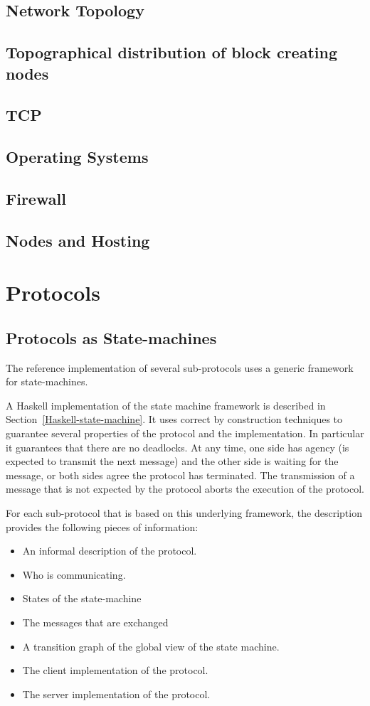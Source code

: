 \documentclass{report}
\theoremstyle{definition}{
  \newtheorem{lemma}{Lemma}[section] %
  \newtheorem{definition}[lemma]{Definition}
}
\theoremstyle{theorem}{
  \newtheorem{invariant}[lemma]{Invariant}
  \newtheorem{proofobligation}[lemma]{Proof Obligation}
}
\numberwithin{equation}{lemma}
\begin{document}
\section{Network Topology}
\section{Topographical distribution of block creating nodes}
\section{TCP}

\section{Operating Systems}
\section{Firewall}
\section{Nodes and Hosting}


\chapter{Protocols}
\section{Protocols as State-machines}
The reference implementation of several sub-protocols uses a generic framework
for state-machines.

A Haskell implementation of the state machine framework is described in
Section~\ref{Haskell-state-machine}. It uses correct by construction
techniques to guarantee
several properties of the protocol and the implementation.
In particular it guarantees that there are no deadlocks. At any time, one side has agency
(is expected to transmit the next message) and the other side is waiting for the message,
or both sides agree the protocol has terminated.
The transmission of a message that is not expected by the protocol aborts the execution
of the protocol.

For each sub-protocol that is based on this underlying framework, the description provides the
following pieces of information:

\begin{itemize}
\item An informal description of the protocol.
\item Who is communicating.
\item States of the state-machine
\item The messages that are exchanged
\item A transition graph of the global view of the state machine.
\item The client implementation of the protocol.
\item The server implementation of the protocol.
\end{itemize}
\end{document}
